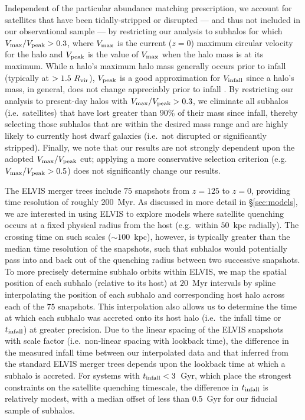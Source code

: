 \documentclass[usenatbib]{mn2e}
\begin{document}
Independent of the particular abundance matching prescription, we
account for satellites that have been tidally-stripped or disrupted
--- and thus not included in our observational sample --- by
restricting our analysis to subhalos for which $V_{\rm max}/V_{\rm
  peak} > 0.3$, where $V_{\rm max}$ is the current ($z=0$) maximum
circular velocity for the halo and $V_{\rm peak}$ is the value of
$V_{\rm max}$ when the halo mass is at its maximum. While a halo's
maximum halo mass generally occurs prior to infall (typically at $>
1.5~R_{\rm vir}$), $V_{\rm peak}$ is a good approximation for $V_{\rm
  infall}$ since a halo's mass, in general, does not change
appreciably prior to infall \citep{behroozi14}. By restricting our
analysis to present-day halos with $V_{\rm max}/V_{\rm peak} > 0.3$,
we eliminate all subhalos (i.e.~satellites) that have lost greater
than $90\%$ of their mass since infall, thereby selecting those
subhalos that are within the desired mass range and are highly likely
to currently host dwarf galaxies (i.e.~not disrupted or significantly
stripped). Finally, we note that our results are not strongly
dependent upon the adopted $V_{\rm max}/V_{\rm peak}$ cut; applying a
more conservative selection criterion (e.g.~$V_{\rm max}/V_{\rm peak}
> 0.5$) does not significantly change our results.



The ELVIS merger trees include $75$ snapshots from $z = 125$ to $z =
0$, providing time resolution of roughly $200$~Myr. As discussed in
more detail in \S\ref{sec:models}, we are interested in using ELVIS to
explore models where satellite quenching occurs at a fixed physical
radius from the host (e.g.~within $50$~kpc radially). The crossing
time on such scales ($\sim100$~kpc), however, is typically greater
than the median time resolution of the snapshots, such that subhalos
would potentially pass into and back out of the quenching radius
between two successive snapshots. To more precisely determine subhalo
orbits within ELVIS, we map the spatial position of each subhalo
(relative to its host) at $20$~Myr intervals by spline interpolating
the position of each subhalo and corresponding host halo across each
of the $75$ snapshots. This interpolation also allows us to determine
the time at which each subhalo was accreted onto its host halo
(i.e.~the infall time or $t_{\rm infall}$) at greater precision. Due
to the linear spacing of the ELVIS snapshots with scale factor
(i.e.~non-linear spacing with lookback time), the difference in the
measured infall time between our interpolated data and that inferred
from the standard ELVIS merger trees depends upon the lookback time at
which a subhalo is accreted. For systems with $t_{\rm infall} <
3$~Gyr, which place the strongest constraints on the satellite
quenching timescale, the difference in $t_{\rm infall}$ is relatively
modest, with a median offset of less than $0.5$~Gyr for our fiducial
sample of subhalos.
\end{document}
